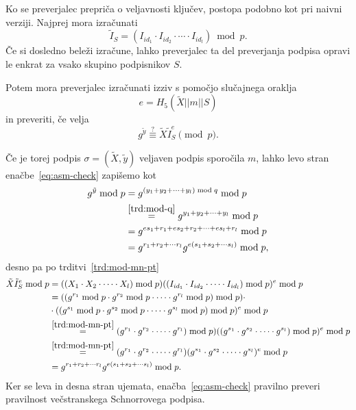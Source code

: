 \documentclass[isrm2, tisk]{fmfdelo}
\begin{document}
Ko se preverjalec prepriča o veljavnosti ključev, postopa podobno kot pri naivni verziji. Najprej
mora izračunati
$$
\tilde{I}_S = (I_{id_1} \cdot I_{id_2} \cdot \cdots \cdot I_{id_l}) \bmod p.
$$
Če si dosledno beleži izračune, lahko preverjalec ta del preverjanja podpisa opravi le enkrat za
vsako skupino podpisnikov $S$.

Potem mora preverjalec izračunati izziv s pomočjo slučajnega oraklja
$$
e = H_5(\tilde{X} || m || S)
$$
in preveriti, če velja
\begin{equation}
\label{eq:asm-check}
g^{\tilde{y}} \stackrel{?}{\equiv} \tilde{X} \tilde{I}_S^e \pmod p.
\end{equation}

Če je torej podpis $\sigma = (\tilde{X}, \tilde{y})$ veljaven podpis sporočila $m$, lahko levo stran
enačbe~\eqref{eq:asm-check} zapišemo kot
\begin{align*}
    g^{\tilde{y}} \bmod p &= g^{(y_1 + y_2 + \cdots + y_l) \bmod q} \bmod p \\
                          &\stackrel{\ref{trd:mod-q}}{=} g^{y_1 + y_2 + \cdots + y_l} \bmod p \\
                          &= g^{e s_1 + r_1 + e s_2 + r_2 + \cdots + e s_l + r_l} \bmod p \\
                          &= g^{r_1 + r_2 + \cdots r_l} g^{e (s_1 + s_2 + \cdots s_l)} \bmod p,
\end{align*}
desno pa po trditvi~\ref{trd:mod-mn-pt}
\begin{align*}
    \tilde{X} \tilde{I}_S^e \bmod p &= ((X_1 \cdot X_2 \cdot \cdots \cdot X_l) \bmod p)
        ((I_{id_1} \cdot I_{id_2} \cdot \cdots \cdot I_{id_l}) \bmod p)^e \bmod p \\
    &=((g^{r_1} \bmod p \cdot g^{r_2} \bmod p \cdot \cdots \cdot g^{r_l} \bmod p) \bmod p) \cdot \\
    &\cdot ((g^{s_1} \bmod p \cdot g^{s_2} \bmod p \cdot \cdots \cdot g^{s_l} \bmod p) \bmod p)^e \bmod p \\
    &\stackrel{\ref{trd:mod-mn-pt}}{=} (g^{r_1} \cdot g^{r_2} \cdot \cdots \cdot g^{r_l}) \bmod p) 
        ((g^{s_1} \cdot g^{s_2} \cdot \cdots \cdot g^{s_l}) \bmod p)^e \bmod p \\
    &\stackrel{\ref{trd:mod-mn-pt}}{=} (g^{r_1} \cdot g^{r_2} \cdot \cdots \cdot g^{r_l}) 
        (g^{s_1} \cdot g^{s_2} \cdot \cdots \cdot g^{s_l})^e \bmod p \\
    &= g^{r_1 + r_2 + \cdots r_l} g^{e (s_1 + s_2 + \cdots s_l)} \bmod p.
\end{align*}
Ker se leva in desna stran ujemata, enačba~\eqref{eq:asm-check} pravilno preveri pravilnost večstranskega
Schnorrovega podpisa.
\end{document}
